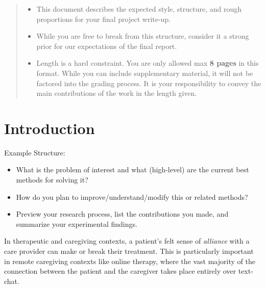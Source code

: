\documentclass{article}
\begin{document}

\begin{abstract}
  \begin{itemize}
  \item This document describes the expected style, structure, and rough proportions for your final project write-up.
  \item While you are free to break from this structure, consider it a strong prior for our expectations of the final report.
  \item Length is a hard constraint. You are only allowed max \textbf{8 pages} in this format. While you can include supplementary material, it will not be factored into the grading process. It is your responsibility to convey the main contributions of the work in the length given.
  \end{itemize}


\end{abstract}

\section{Introduction}
\label{sec:introduction}

Example Structure:
\begin{itemize}
\item What is the problem of interest and what (high-level) are the current best methods for solving it?
\item How do you plan to improve/understand/modify this or related methods?
\item Preview your research process, list the contributions you made, and summarize your experimental findings.
\end{itemize}

In therapeutic and caregiving contexts, a patient’s felt sense of \textit{alliance} with a care provider can make or break their treatment. This is particularly important in remote caregiving contexts like online therapy, where the vast majority of the connection between the patient and the caregiver takes place entirely over text-chat. 

\end{document}
